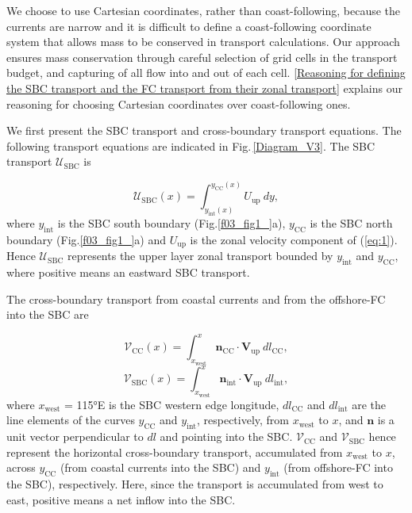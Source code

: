 \documentclass[preprint,3p,review,12pt]{elsarticle}
\renewcommand{\Vec}[1]{\mathbf{#1}}
\newcommand{\sub}[1]{_{\text{#1}}}
\begin{document}
We choose to use Cartesian coordinates, rather than coast-following, because the currents are narrow and it is difficult to define a coast-following coordinate system that allows mass to be conserved in transport calculations. Our approach ensures mass conservation through careful selection of grid cells in the transport budget, and capturing of all flow into and out of each cell. \ref{Reasoning for defining the SBC transport and the FC transport from their zonal transport} explains our reasoning for choosing Cartesian coordinates over coast-following ones.

We first present the SBC transport and cross-boundary transport equations. The following transport equations are indicated in Fig.\,\ref{Diagram_V3}. The SBC transport $\mathcal{U}\sub{SBC}$ is 

\begin{equation} \label{eq:3}
\mathcal{U}\sub{SBC}(x) = \int_{y\sub{int}(x)}^{y\sub{CC}(x)}{U}\sub{up}\ dy,
\end{equation}
%
where $y\sub{int}$ is the SBC south boundary (Fig.\ref{f03_fig1_}a), $y\sub{CC}$ is the SBC north boundary (Fig.\ref{f03_fig1_}a) and $U\sub{up}$ is the zonal velocity component of (\ref{eq:1}). Hence $\mathcal{U}\sub{SBC}$ represents the upper layer zonal transport bounded by $y\sub{int}$ and $y\sub{CC}$, where positive means an eastward SBC transport. 

The cross-boundary transport from coastal currents and from the offshore-FC into the SBC are 

\begin{equation} \label{eq:4}
\mathcal{V}\sub{CC}(x) = \int_{x\sub{west}}^{x}\Vec{n}\sub{CC}\cdot\Vec{V}\sub{up}\ dl\sub{CC},
\end{equation}
%
\begin{equation} \label{eq:5}
\mathcal{V}\sub{SBC}(x) = \int_{x\sub{west}}^{x}\Vec{n}\sub{int}\cdot\Vec{V}\sub{up}\ dl\sub{int},
\end{equation}
%
where $x\sub{west}$ = \ang{115}E is the SBC western edge longitude, $dl\sub{CC}$ and $dl\sub{int}$ are the line elements of the curves $y\sub{CC}$ and $y\sub{int}$, respectively, from $x\sub{west}$ to $x$, and $\Vec{n}$ is a unit vector perpendicular to $dl$ and pointing into the SBC\@.
$\mathcal{V}\sub{CC}$ and $\mathcal{V}\sub{SBC}$ hence represent the horizontal cross-boundary transport, accumulated from $x\sub{west}$ to $x$, across $y\sub{CC}$ (from coastal currents into the SBC) and $y\sub{int}$ (from offshore-FC into the SBC), respectively. Here, since the transport is accumulated from west to east, positive means a net inflow into the SBC.
\end{document}
